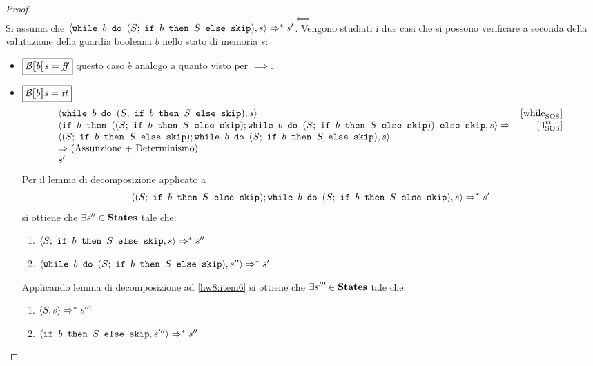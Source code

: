 \begin{proof}

$$
\boxed{\impliedby}
$$
Si assuma che
$\confSs{\wbS{b}{(S;\ \ifABC{b}{S}{\skipForFriends})}}{s} \Rar{*} s'$. Vengono
studiati i due casi che si possono verificare a seconda della valutazione
della guardia booleana $b$ nello stato di memoria $s$:

\begin{itemize}
  \item $\boxed{\B{b} = \semfalse}$ questo caso è analogo a quanto visto per
    $\boxed{\implies}$.
  \item $\boxed{\B{b} = \semtrue}$
  $$
  \begin{array}{lr}
  \confSs{\wbS{b}{(S;\ \ifABC{b}{S}{\skipForFriends})}}{s} & \whileSOS \\
  \confSs{\ifABC{b}
            {((S;\ \ifABC{b}{S}{\skipForFriends});
              \wbS{b}{(S;\ \ifABC{b}{S}{\skipForFriends})})}
            {\skipForFriends}
         }{s} \Rar{ }& \ifttSOS \\
  \confSs{  (S;\ \ifABC{b}{S}{\skipForFriends});
            \wbS{b}{(S;\ \ifABC{b}{S}{\skipForFriends})}
         }{s} \\
  \Rar{ } (\text{Assunzione + Determinismo})\\
  s'
  \end{array}
  $$
  Per il lemma di decomposizione applicato a
  \begin{equation}
  \confSs{  (S;\ \ifABC{b}{S}{\skipForFriends});
            \wbS{b}{(S;\ \ifABC{b}{S}{\skipForFriends})}
         }{s}
    \Rar{*} s'
  \label{eq:hw8:isimpl}
  \end{equation}
  si ottiene che $\exists s'' \in \states$ tale che:
  \begin{enumerate}[label=(\alph*)]
    \item $\confSs{S;\ \ifABC{b}{S}{\skipForFriends}}{s} \Rar{*} s''$
    \label{hw8:item6}
    \item $\confSs{\wbS{b}{(S;\ \ifABC{b}{S}{\skipForFriends})}}{s''}
      \Rar{*} s'$
    \label{hw8:item7}
  \end{enumerate}
  Applicando lemma di decomposizione ad \ref{hw8:item6}
  si ottiene che $\exists{s'''}\in\states$ tale che:
  \begin{enumerate}[label=(\alph*)]
    \item $\confSs{S}{s} \Rar{*} s'''$
    \label{hw8:item8}
    \item $\confSs{\ifABC{b}{S}{\skipForFriends}}{s'''} \Rar{*} s''$
    \label{hw8:item9}
  \end{enumerate}

\end{itemize}
\end{proof}
